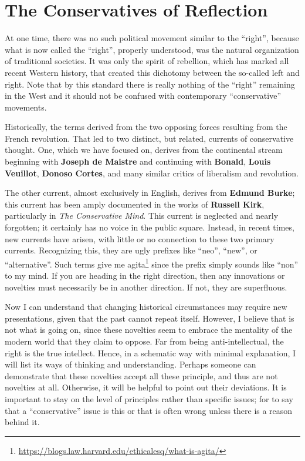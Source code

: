\section{The Conservatives of Reflection}

At one time, there was no such political movement similar to the ``right'', because what is now called the ``right'', properly understood, was the natural organization of traditional societies. It was only the spirit of rebellion, which has marked all recent Western history, that created this dichotomy between the so-called left and right. Note that by this standard there is really nothing of the ``right'' remaining in the West and it should not be confused with contemporary ``conservative'' movements.

Historically, the terms derived from the two opposing forces resulting from the French revolution. That led to two distinct, but related, currents of conservative thought. One, which we have focused on, derives from the continental stream beginning with \textbf{Joseph de Maistre} and continuing with \textbf{Bonald}, \textbf{Louis Veuillot}, \textbf{Donoso Cortes}, and many similar critics of liberalism and revolution.

The other current, almost exclusively in English, derives from \textbf{Edmund Burke}; this current has been amply documented in the works of \textbf{Russell Kirk}, particularly in \emph{The Conservative Mind}. This current is neglected and nearly forgotten; it certainly has no voice in the public square. Instead, in recent times, new currents have arisen, with little or no connection to these two primary currents. Recognizing this, they are ugly prefixes like ``neo'', ``new'', or ``alternative''. Such terms give me agita\footnote{\url{https://blogs.law.harvard.edu/ethicalesq/what-is-agita/}} since the prefix simply sounds like ``non'' to my mind. If you are heading in the right direction, then any innovations or novelties must necessarily be in another direction. If not, they are superfluous.

Now I can understand that changing historical circumstances may require new presentations, given that the past cannot repeat itself. However, I believe that is not what is going on, since these novelties seem to embrace the mentality of the modern world that they claim to oppose. Far from being anti-intellectual, the right is the true intellect. Hence, in a schematic way with minimal explanation, I will list its ways of thinking and understanding. Perhaps someone can demonstrate that these novelties accept all these principle, and thus are not novelties at all. Otherwise, it will be helpful to point out their deviations. It is important to stay on the level of principles rather than specific issues; for to say that a ``conservative'' issue is this or that is often wrong unless there is a reason behind it.

